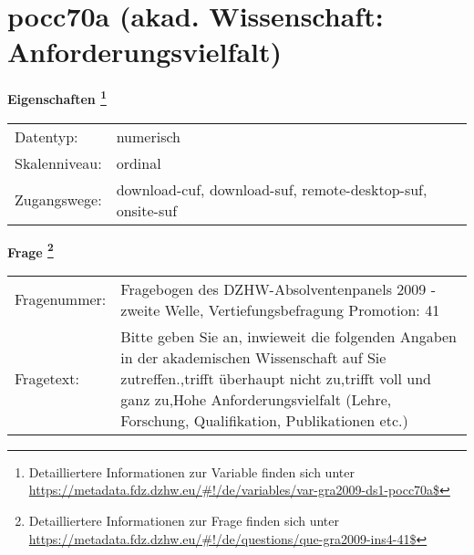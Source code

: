 
    \setcounter{footnote}{0}

    \vspace*{-1.8cm}
	\section{pocc70a (akad. Wissenschaft: Anforderungsvielfalt)}
	\label{section:pocc70a}



    \vspace*{0.5cm}
    \noindent\textbf{Eigenschaften
	\footnote{Detailliertere Informationen zur Variable finden sich unter
		\url{https://metadata.fdz.dzhw.eu/\#!/de/variables/var-gra2009-ds1-pocc70a$}}}\\
	\begin{tabularx}{\hsize}{@{}lX}
	Datentyp: & numerisch \\
	Skalenniveau: & ordinal \\
	Zugangswege: &
	  download-cuf, 
	  download-suf, 
	  remote-desktop-suf, 
	  onsite-suf
 \\
    \end{tabularx}



				\vspace*{0.5cm}
                \noindent\textbf{Frage
	                \footnote{Detailliertere Informationen zur Frage finden sich unter
		              \url{https://metadata.fdz.dzhw.eu/\#!/de/questions/que-gra2009-ins4-41$}}}\\
				\begin{tabularx}{\hsize}{@{}lX}
					Fragenummer: &
					  Fragebogen des DZHW-Absolventenpanels 2009 - zweite Welle, Vertiefungsbefragung Promotion:
					  41
 \\
					Fragetext: & Bitte geben Sie an, inwieweit die folgenden Angaben in der akademischen Wissenschaft auf Sie zutreffen.,trifft überhaupt nicht zu,trifft voll und ganz zu,Hohe Anforderungsvielfalt (Lehre, Forschung, Qualifikation, Publikationen etc.) \\
				\end{tabularx}





